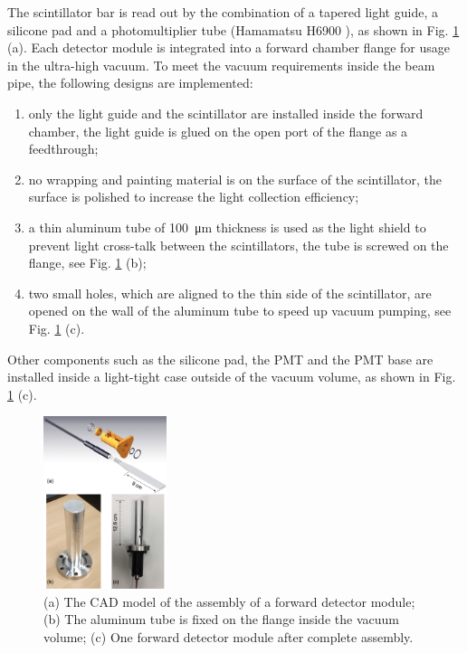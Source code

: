 \documentclass[number,5p]{elsarticle}
\begin{document}
The scintillator bar is read out by the combination of a tapered light guide, a silicone pad and a
photomultiplier tube (Hamamatsu H6900 \cite{hamamatsu}), as shown in Fig. \ref{fig:forward_module} (a).
Each detector module is integrated into a forward chamber flange for usage
in the ultra-high vacuum.
To meet the vacuum requirements inside the beam pipe, the following designs are implemented:
\begin{enumerate}
\item only the light guide and the scintillator are installed inside the forward chamber, the light guide is glued on the open port of the flange as a feedthrough;
\item no wrapping and painting material is on the surface of the scintillator, the
  surface is polished to increase the light collection efficiency;
\item a thin aluminum tube of \SI{100}{\micro\meter} thickness is used as
  the light shield to prevent light cross-talk between the scintillators, the tube is screwed on the flange, see Fig. \ref{fig:forward_module} (b);
\item two small holes, which are aligned to the thin side of the scintillator, are opened on the wall of the aluminum tube to speed up vacuum pumping, see Fig. \ref{fig:forward_module} (c).
\end{enumerate}
Other components such as the silicone pad, the PMT and the PMT base are
installed inside a light-tight case outside of the vacuum volume, as shown in Fig. \ref{fig:forward_module} (c).
\begin{figure}[htbp]
  \centering
  \includegraphics[width=0.32\textwidth]{./forward_module.png}
  \caption{(a) The CAD model of the assembly of a forward detector module; (b) The
    aluminum tube is fixed on the flange inside the vacuum volume; (c) One forward detector module after complete assembly.}
  \label{fig:forward_module}
\end{figure}
\end{document}

